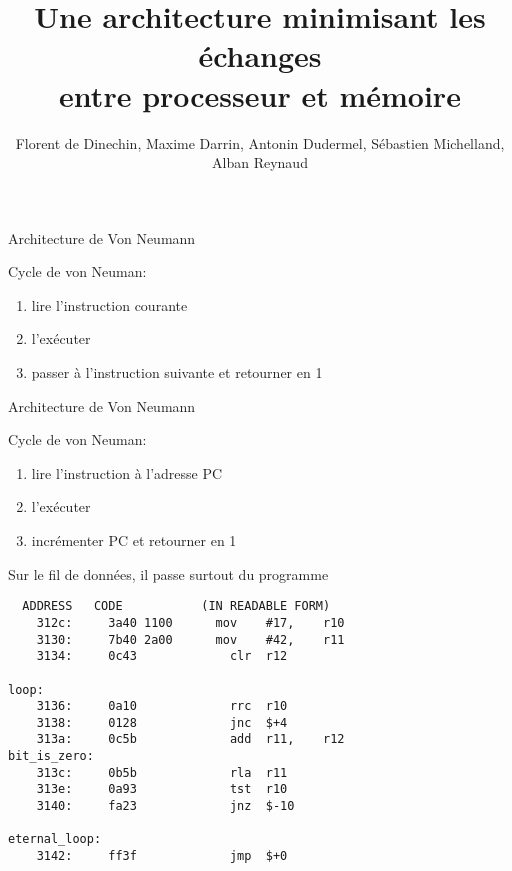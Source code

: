 \documentclass[slidetop,11pt,table]{beamer}
\title{Une architecture minimisant les échanges\\ entre processeur et mémoire}
\author{Florent de Dinechin, Maxime Darrin, Antonin Dudermel, Sébastien Michelland, Alban Reynaud}
\date{}
\begin{document}
\frame{\titlepage}


\begin{frame}{Architecture de Von Neumann}
  \begin{figure}[b]
    \begin{center}
    \end{center}
  \end{figure}
  Cycle de von Neuman:
  \begin{enumerate}
  \item lire l'instruction courante
  \item l'exécuter
  \item passer à l'instruction suivante et retourner en 1
  \end{enumerate}
\end{frame}


\begin{frame}{Architecture de Von Neumann}
  \begin{figure}[b]
    \begin{center}
    \end{center}
  \end{figure}
  Cycle de von Neuman:
  \begin{enumerate}
  \item lire l'instruction à l'adresse PC
  \item l'exécuter
  \item incrémenter PC et retourner en 1
  \end{enumerate}
\end{frame}



\begin{frame}[fragile]{Sur le fil de données, il passe surtout du programme}
\begin{verbatim}
  ADDRESS   CODE           (IN READABLE FORM) 
    312c:	  3a40 1100      mov	#17,	r10	
    3130:	  7b40 2a00      mov	#42,	r11	
    3134:	  0c43       	   clr	r12		

loop:
    3136:	  0a10       	   rrc	r10		
    3138:	  0128       	   jnc	$+4      
    313a:	  0c5b       	   add	r11,	r12	
bit_is_zero:
    313c:	  0b5b       	   rla	r11		
    313e:	  0a93       	   tst	r10		
    3140:	  fa23       	   jnz	$-10     	

eternal_loop:
    3142:	  ff3f       	   jmp	$+0      	
\end{verbatim}
\end{frame}
\end{document}
